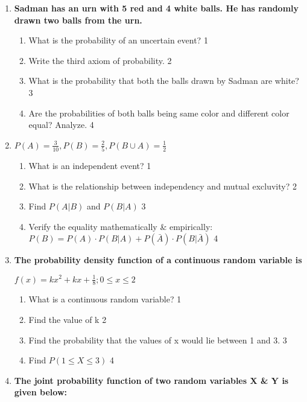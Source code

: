 \documentclass{article}
\begin{document}
\begin{enumerate}

 \item
	  \textbf{Sadman has an urn with 5 red and 4 white balls. He has randomly drawn two balls from the urn.} 
  
  \begin{enumerate}
    \item
	What is the probability of an uncertain event? \hfill 1
    \item
	Write the third axiom of probability. \hfill 2
    \item  
	What is the probability that both the balls drawn by Sadman are white? \hfill 3
    \item
	Are the probabilities of both balls being same color and different color equal? Analyze. \hfill 4
  \end{enumerate}

 \item
	  \textbf{$P(A) = \frac{3}{10}, P(B) = \frac 25, P(B\cup A) = \frac12$} 
  
  \begin{enumerate}
    \item
	What is an independent event? \hfill 1
    \item
	What is the relationship between independency and mutual excluvity? \hfill 2
    \item  
	Find $P(A \vert B)$ and $P(B \vert A)$ \hfill 3
    \item
	Verify the equality mathematically \& empirically: $P(B) = P(A) \cdot P(B \vert A) + P(\bar A) \cdot P(B \vert \bar A)$ \hfill 4
  \end{enumerate}

 \item
  \textbf{The probability density function of a continuous random variable is}

$f(x) =kx^2+kx+ \frac 18; 0 \le x \le 2 $

  \begin{enumerate}
    \item
	What is a continuous random variable? \hfill 1
    \item
    	Find the value of k \hfill 2
    \item
    	Find the probability that the values of x would lie between 1 and 3. \hfill 3
     \item
     	Find $P(1 \le X \le 3)$  \hfill 4
  \end{enumerate}

 \item
	  \textbf{The joint probability function of two random variables X \& Y is given below:}


\end{enumerate}
\end{document}
